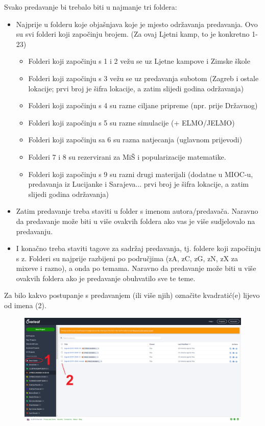     Svako predavanje bi trebalo biti u najmanje tri foldera:
    \begin{itemize}
        \item Najprije u folderu koje objašnjava koje je mjesto održavanja predavanja. Ovo su svi folderi koji započinju brojem. (Za ovaj Ljetni kamp, to je konkretno 1-23)
         \begin{itemize}
             \item Folderi koji započinju s 1 i 2 vežu se uz Ljetne kampove i Zimske škole
             \item Folderi koji započinju s 3 vežu se uz predavanja subotom (Zagreb i ostale lokacije; prvi broj je šifra lokacije, a zatim slijedi godina održavanja)
             \item Folderi koji započinju s 4 su razne ciljane pripreme (npr. prije Državnog)
             \item Folderi koji započinju s 5 su razne simulacije (+ ELMO/JELMO)
             \item Folderi koji započinju sa 6 su razna natjecanja (uglavnom prijevodi)
             \item Folderi 7 i 8 su rezervirani za MiŠ i popularizacije matematike.
             \item Folderi koji započinju s 9 su razni drugi materijali (dodatne u MIOC-u, predavanja iz Lucijanke i Sarajeva... prvi broj je šifra lokacije, a zatim slijedi godina održavanja)
         \end{itemize}
         \item Zatim predavanje treba staviti u folder s imenom autora/predavača. Naravno da predavanje može biti u više ovakvih foldera ako vas je više sudjelovalo na predavanju.
         \item I konačno treba staviti tagove za sadržaj predavanja, tj. foldere koji započinju s z. Folderi su najprije razbijeni po područjima (zA, zC, zG, zN, zX za mixeve i razno), a onda po temama. Naravno da predavanje može biti u više ovakvih foldera ako je predavanje obuhvatilo sve te teme.
    \end{itemize}
    
    Za bilo kakvo postupanje s predavanjem (ili više njih) označite kvadratić(e) lijevo od imena (2).
    
    \begin{figure}[h]
        \centering
        \includegraphics[width = \textwidth]{images/Primjer_1.png}
    \end{figure}
    
